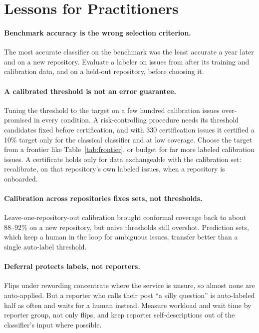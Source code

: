 \section{Lessons for Practitioners}

\paragraph{Benchmark accuracy is the wrong selection criterion.} The most accurate classifier on the
benchmark was the least accurate a year later and on a new repository. Evaluate a labeler on issues
from after its training and calibration data, and on a held-out repository, before choosing it.

\paragraph{A calibrated threshold is not an error guarantee.} Tuning the threshold to the target on a
few hundred calibration issues over-promised in every condition. A risk-controlling procedure needs
its threshold candidates fixed before certification, and with 330 certification issues it certified
a 10\% target only for the classical classifier and at low coverage. Choose the target from a
frontier like Table~\ref{tab:frontier}, or budget for far more labeled calibration issues. A
certificate holds only for data exchangeable with the calibration set: recalibrate, on that
repository's own labeled issues, when a repository is onboarded.

\paragraph{Calibration across repositories fixes sets, not thresholds.} Leave-one-repository-out
calibration brought conformal coverage back to about 88--92\% on a new repository, but naive
thresholds still overshot. Prediction sets, which keep a human in the loop for ambiguous issues,
transfer better than a single auto-label threshold.

\paragraph{Deferral protects labels, not reporters.} Flips under rewording concentrate where the
service is unsure, so almost none are auto-applied. But a reporter who calls their post ``a silly
question'' is auto-labeled half as often and waits for a human instead. Measure workload and wait
time by reporter group, not only flips, and keep reporter self-descriptions out of the classifier's
input where possible.

